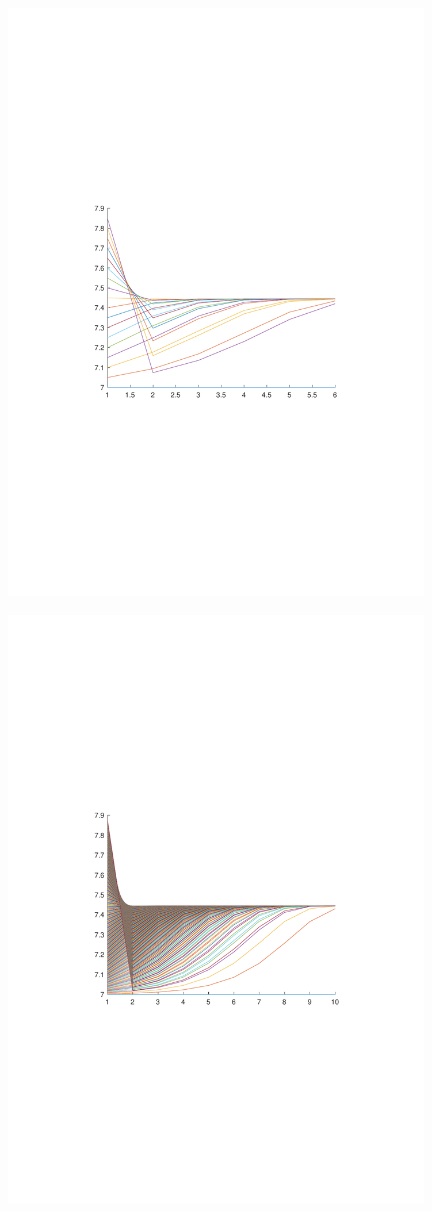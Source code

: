 \begin{figure}[H]
\centering
\includegraphics[width=11cm]{fig/2_1.pdf}
\end{figure}

\begin{figure}[H]
\centering
\includegraphics[width=11cm]{fig/2_2.pdf}
\end{figure}
